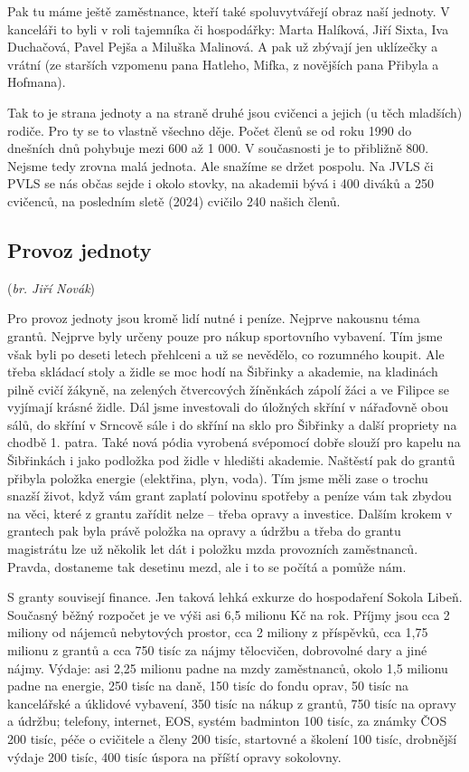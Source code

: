 Pak tu máme ještě zaměstnance, kteří také spoluvytvářejí obraz naší
jednoty. V kanceláři to byli v roli tajemníka či hospodářky: Marta
Halíková, Jiří Sixta, Iva Duchačová, Pavel Pejša a Miluška Malinová. A
pak už zbývají jen uklízečky a vrátní (ze starších vzpomenu pana
Hatleho, Mifka, z novějších pana Přibyla a Hofmana).

Tak to je strana jednoty a na straně druhé jsou cvičenci a jejich (u
těch mladších) rodiče. Pro ty se to vlastně všechno děje. Počet členů se
od roku 1990 do dnešních dnů pohybuje mezi 600 až 1 000. V současnosti
je to přibližně 800. Nejsme tedy zrovna malá jednota. Ale snažíme se
držet pospolu. Na JVLS či PVLS se nás občas sejde i okolo stovky, na
akademii bývá i 400 diváků a 250 cvičenců, na posledním sletě (2024)
cvičilo 240 našich členů.

\subsection{\texorpdfstring{Provoz jednoty
}{Provoz jednoty }}\label{provoz-jednoty}

(\emph{br. Jiří Novák})

Pro provoz jednoty jsou kromě lidí nutné i peníze. Nejprve nakousnu téma
grantů. Nejprve byly určeny pouze pro nákup sportovního vybavení. Tím
jsme však byli po deseti letech přehlceni a už se nevědělo, co rozumného
koupit. Ale třeba skládací stoly a židle se moc hodí na Šibřinky a
akademie, na kladinách pilně cvičí žákyně, na zelených čtvercových
žíněnkách zápolí žáci a ve Filipce se vyjímají krásné židle. Dál jsme
investovali do úložných skříní v nářaďovně obou sálů, do skříní v
Srncově sále i do skříní na sklo pro Šibřinky a další propriety na
chodbě 1. patra. Také nová pódia vyrobená svépomocí dobře slouží pro
kapelu na Šibřinkách i jako podložka pod židle v hledišti akademie.
Naštěstí pak do grantů přibyla položka energie (elektřina, plyn, voda).
Tím jsme měli zase o trochu snazší život, když vám grant zaplatí
polovinu spotřeby a peníze vám tak zbydou na věci, které z grantu
zařídit nelze -- třeba opravy a investice. Dalším krokem v grantech pak
byla právě položka na opravy a údržbu a třeba do grantu magistrátu lze
už několik let dát i položku mzda provozních zaměstnanců. Pravda,
dostaneme tak desetinu mezd, ale i to se počítá a pomůže nám.

S granty souvisejí finance. Jen taková lehká exkurze do hospodaření
Sokola Libeň. Současný běžný rozpočet je ve výši asi 6,5 milionu Kč na
rok. Příjmy jsou cca 2 miliony od nájemců nebytových prostor, cca 2
miliony z příspěvků, cca 1,75 milionu z grantů a cca 750 tisíc za nájmy
tělocvičen, dobrovolné dary a jiné nájmy. Výdaje: asi 2,25 milionu padne
na mzdy zaměstnanců, okolo 1,5 milionu padne na energie, 250 tisíc na
daně, 150 tisíc do fondu oprav, 50 tisíc na kancelářské a úklidové
vybavení, 350 tisíc na nákup z grantů, 750 tisíc na opravy a údržbu;
telefony, internet, EOS, systém badminton 100 tisíc, za známky ČOS 200
tisíc, péče o cvičitele a členy 200 tisíc, startovné a školení 100
tisíc, drobnější výdaje 200 tisíc, 400 tisíc úspora na příští opravy
sokolovny.

